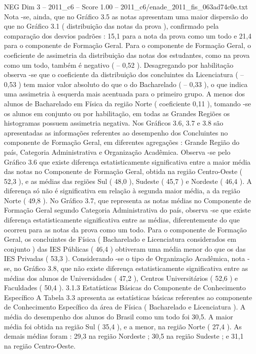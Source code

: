 \begin{textsample}{NEG Dim 3 – 2011\_c6 – Score 1.00 – 2011\_c6/enade\_2011\_fis\_063ad74c0e.txt}
Nota -se, ainda, que no Gráfico 3.5 as notas apresentam uma maior dispersão do que no Gráfico 3.1 ( distribuição das notas da prova ), confirmado pela comparação dos desvios padrões : 15,1 para a nota da prova como um todo e 21,4 para o componente de Formação Geral.
Para o componente de Formação Geral, o coeficiente de assimetria da distribuição das notas dos estudantes, como na prova como um todo, também é negativo ( – 0,52 ).
Desagregando por habilitação observa -se que o coeficiente da distribuição dos concluintes da Licenciatura ( – 0,53 ) tem maior valor absoluto do que o do Bacharelado ( – 0,33 ), o que indica uma assimetria à esquerda mais acentuada para o primeiro grupo.
A menos dos alunos de Bacharelado em Física da região Norte ( coeficiente 0,11 ), tomando -se os alunos em conjunto ou por habilitação, em todas as Grandes Regiões os histogramas possuem assimetria negativa.
Nos Gráficos 3.6, 3.7 e 3.8 são apresentadas as informações referentes ao desempenho dos Concluintes no componente de Formação Geral, em diferentes agregações : Grande Região do país, Categoria Administrativa e Organização Acadêmica.
Observa -se pelo Gráfico 3.6 que existe diferença estatisticamente significativa entre a maior média das notas no Componente de Formação Geral, obtida na região Centro-Oeste ( 52,3 ), e as médias das regiões Sul ( 48,0 ), Sudeste ( 45,7 ) e Nordeste ( 46,4 ).
A diferença só não é significativa em relação à segunda maior média, a da região Norte ( 49,8 ).
No Gráfico 3.7, que representa as notas médias no Componente de Formação Geral segundo Categoria Administrativa do país, observa -se que existe diferença estatisticamente significativa entre as médias, diferentemente do que ocorreu para as notas da prova como um todo.
Para o componente de Formação Geral, os concluintes de Física ( Bacharelado e Licenciatura considerados em conjunto ) das IES Públicas ( 46,4 ) obtiveram uma média menor do que os das IES Privadas ( 53,3 ).
Considerando -se o tipo de Organização Acadêmica, nota -se, no Gráfico 3.8, que não existe diferença estatisticamente significativa entre as médias dos alunos de Universidades ( 47,2 ), Centros Universitários ( 52,6 ) e Faculdades ( 50,4 ). 3.1.3 Estatísticas Básicas do Componente de Conhecimento Específico A Tabela 3.3 apresenta as estatísticas básicas referentes ao componente de Conhecimento Específico da área de Física ( Bacharelado e Licenciatura ).
A média do desempenho dos alunos do Brasil como um todo foi 30,5.
A maior média foi obtida na região Sul ( 35,4 ), e a menor, na região Norte ( 27,4 ).
As demais médias foram : 29,3 na região Nordeste ; 30,5 na região Sudeste ; e 31,1 na região Centro-Oeste.

\end{textsample}
